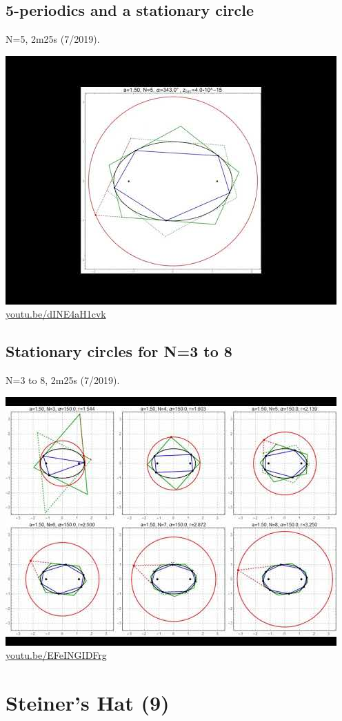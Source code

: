 \documentclass[12pt]{amsart}
\begin{document}
\subsection{5-periodics and a stationary circle}
\label{vid:dINE4aH1cvk}
\noindent N=5, 2m25s (7/2019). 
\begin{center}\includegraphics[width=.5\textwidth]{pics/dINE4aH1cvk.jpg} \\ 
\href{https://youtu.be/dINE4aH1cvk}{\url{youtu.be/dINE4aH1cvk}}\end{center}
% 

\subsection{Stationary circles for N=3 to 8}
\label{vid:EFeINGIDFrg}
\noindent N=3 to 8, 2m25s (7/2019). 
\begin{center}\includegraphics[width=.5\textwidth]{pics/EFeINGIDFrg.jpg} \\ 
\href{https://youtu.be/EFeINGIDFrg}{\url{youtu.be/EFeINGIDFrg}}\end{center}
% 


\section{Steiner's Hat (9)}
\end{document}
